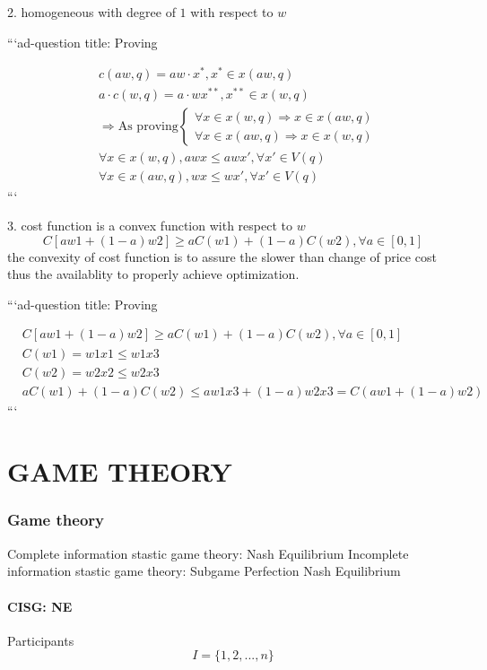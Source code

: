 \documentclass{article}
\begin{document}
2.
homogeneous with degree of $1$ with respect to $w$

```ad-question
title: Proving

\begin{align}
&c(aw,q)=aw\cdot x^{*},x^{*} \in x(aw,q)
\\&a\cdot c(w,q)=a\cdot w x^{**},x^{**}  \in x(w,q)
\\&\Rightarrow \text{As proving}\begin{cases}
\forall x\in x(w,q) \Rightarrow x\in x(aw,q) \\\forall x\in x(aw,q) \Rightarrow x\in x(w,q) 
\end{cases}
\\& \forall x \in x(w,q),awx\le awx', \forall x' \in V(q)
\\& \forall x \in x(aw,q), wx\le wx', \forall x' \in V(q)
\end{align}
```

3.
cost function is a convex function with respect to $w$
$$C[aw1+(1-a)w2]\ge a C(w1)+(1-a)C(w2), \forall a \in [0,1]$$
the convexity of cost function is to assure the slower than change of price cost thus the availablity to properly achieve optimization.

```ad-question
title: Proving

\begin{align}
& C[aw1+(1-a)w2]\ge a C(w1)+(1-a)C(w2), \forall a \in [0,1]
\\& C(w1)=w1x1\le w1x3
\\&C(w2)=w2x2\le w2x3
\\&aC(w1)+(1-a)C(w2)\le aw1x3+(1-a)w2x3=C(aw1+(1-a)w2)
\end{align}
```


\newpage
\part{GAME THEORY}

\newpage
\section{Game theory}
Complete information stastic game theory: Nash Equilibrium
Incomplete information stastic game theory: Subgame Perfection Nash Equilibrium

\subsection{CISG: NE}
Participants
$$I=\{1,2,...,n\}$$
\end{document}
